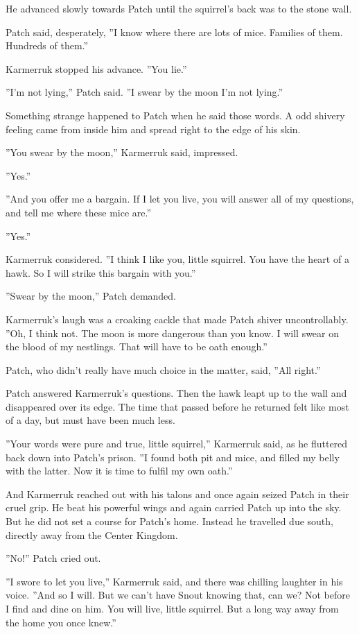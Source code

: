 \documentclass[11pt]{article}
\begin{document}
He advanced slowly towards Patch until the squirrel's back was to the stone wall.\par
Patch said, desperately, ''I know where there are lots of mice. Families of them. Hundreds of them.''\par
Karmerruk stopped his advance. ''You lie.''\par
''I'm not lying,'' Patch said. ''I swear by the moon I'm not lying.''\par
Something strange happened to Patch when he said those words. A odd shivery feeling came from inside him and spread right to the edge of his skin.\par
''You swear by the moon,'' Karmerruk said, impressed.\par
''Yes.''\par
''And you offer me a bargain. If I let you live, you will answer all of my questions, and tell me where these mice are.''\par
''Yes.''\par
Karmerruk considered. ''I think I like you, little squirrel. You have the heart of a hawk. So I will strike this bargain with you.''\par
''Swear by the moon,'' Patch demanded.\par
Karmerruk's laugh was a croaking cackle that made Patch shiver uncontrollably. ''Oh, I think not. The moon is more dangerous than you know. I will swear on the blood of my nestlings. That will have to be oath enough.''\par
Patch, who didn't really have much choice in the matter, said, ''All right.''\par
Patch answered Karmerruk's questions. Then the hawk leapt up to the wall and disappeared over its edge. The time that passed before he returned felt like most of a day, but must have been much less.\par
''Your words were pure and true, little squirrel,'' Karmerruk said, as he fluttered back down into Patch's prison. ''I found both pit and mice, and filled my belly with the latter. Now it is time to fulfil my own oath.''\par
And Karmerruk reached out with his talons and once again seized Patch in their cruel grip. He beat his powerful wings and again carried Patch up into the sky. But he did not set a course for Patch's home. Instead he travelled due south, directly away from the Center Kingdom.\par
''No!'' Patch cried out.\par
''I swore to let you live,'' Karmerruk said, and there was chilling laughter in his voice. ''And so I will. But we can't have Snout knowing that, can we? Not before I find and dine on him. You will live, little squirrel. But a long way away from the home you once knew.''\par
\end{document}

